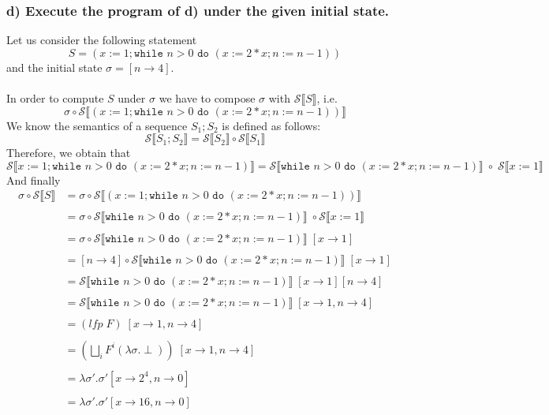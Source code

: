 \documentclass{article}
\newcommand{\while}{\texttt{while $n>0$ do $(x:=2 * x;n:=n-1)$}}
\newcommand{\scal}{\mathcal{S}}
\newcommand{\sem}[1]{\scal \llbracket #1 \rrbracket}
\begin{document}
\subsubsection*{d) Execute the program of d) under the given initial state.}
Let us consider the following statement $$S = (x:=1;\while)$$ and the initial state $\sigma = [n \rightarrow 4]$.\\\\
In order to compute $S$ under $\sigma$ we have to compose $\sigma$ with $\sem{S}$, i.e. $$\sigma \circ \sem{(x:=1;\while)}$$
We know the semantics of a sequence $S_1;S_2$ is defined as follows: $$\sem{S_1;S_2} = \sem{S_2} \circ \sem{S_1}$$ Therefore, we obtain that  $$\sem{x:=1;\while} = \sem{\while} \; \circ \; \sem{x:=1}$$
And finally
\begin{align*}
\sigma \circ \sem{S} &= \sigma \circ \sem{(x:=1;\while)} \\ \\
& = \sigma \circ \sem{\while} \; \circ \sem{x:=1} \\ \\
& = \sigma \circ \sem{\while} \; [x \rightarrow 1 ] \\ \\
& = [n \rightarrow 4] \circ \sem{\while} \; [x \rightarrow 1 ] \\ \\
& = \sem{\while} \; [x \rightarrow 1 ] [n \rightarrow 4]\\ \\
& = \sem{\while} \; [x \rightarrow 1, n \rightarrow 4]\\ \\
& = (lfp \; F) \; [x \rightarrow 1, n \rightarrow 4]\\ \\
& = \left( \bigsqcup_i F^i(\lambda\sigma.\perp) \right) \; [x \rightarrow 1, n \rightarrow 4]\\ \\
& = \lambda \sigma' . \sigma'[x \rightarrow 2^4, n \rightarrow 0] \\ \\
& = \lambda \sigma' . \sigma'[x \rightarrow 16, n \rightarrow 0]
\end{align*}\\
\end{document}
